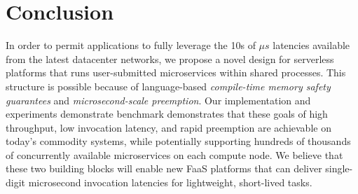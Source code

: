 \section{Conclusion}
\label{sec:concl}

In order to permit applications to fully leverage the 10s of $\mu{}s$
latencies available from the latest datacenter networks, we propose a novel design
for serverless platforms that runs user-submitted microservices within shared
processes.  This structure is possible because of language-based
\textit{compile-time memory safety guarantees} and \textit{microsecond-scale
preemption}.  Our
\ifdefined\mk
implementation and experiments demonstrate
\else
benchmark demonstrates
\fi
that these goals of
high throughput, low invocation latency, and rapid preemption are achievable
on today's commodity systems, while potentially supporting hundreds of thousands of
concurrently available microservices on each compute node.  We believe that these
two building blocks will enable new FaaS platforms that can deliver single-digit
microsecond invocation latencies for lightweight, short-lived tasks.
